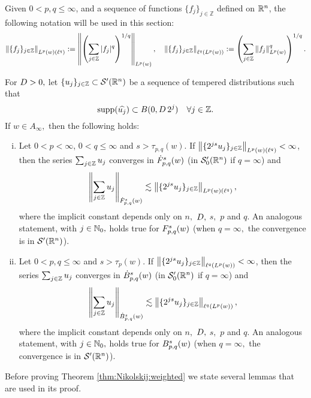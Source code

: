 Given $0<p,q\leq\infty$, and a sequence of functions $\{ f_j\}_{j\in\mathbb{Z}}$ defined on $\re^n$, the following notation will be used in this section:
\[ \norm{\{f_j\}_{j\in\mathbb{Z}}}{L^p(w)(\ell^q)}:= \norm{\left( \sum\limits_{j\in\mathbb{Z}} |f_j|^q \right)^{1/q} }{L^p(w)}, \quad \norm{\{f_j\}_{j\in\mathbb{Z}}}{\ell^q(L^p(w))}:=\left( \sum\limits_{j\in\mathbb{Z}} \norm{f_j}{L^p(w)}^q \right)^{1/q}. \] 
\begin{theorem} \label{thm:Nikolskij:weighted} For $\A> 0,$ let $\{u_j\}_{j \in \ent} \subset \mathcal{S}'(\rn)$ be a sequence of tempered distributions such that
\begin{equation*}
\supp(\widehat{u_j}) \subset B(0, \A\, 2^j ) \quad \forall j \in \ent.
\end{equation*}
If $w\in A_\infty,$ then the following holds:  
\begin{enumerate}[(i)]
\item\label{item:thh:Nikolskij:TL} Let $0 < p < \infty$, $0 < q \leq \infty$ and $s > \tau_{p,q}(w)$. If $\norm{\{2^{js} u_j\}_{j\in\ent}}{L^p(w)(\ell^{q})} < \infty$, then the series $\sum_{j \in \ent} u_j$ converges in $\tlw{p}{s}{q}{w}$ (in $\mathcal{S}'_0(\rn)$ if $q=\infty$) and 
\begin{equation*}
\norm{\sum_{j \in \ent} u_j}{\tlw{p}{s}{q}{w}} \lesssim  \norm{\{2^{js} u_j\}_{j\in\ent}}{L^p(w)(\ell^{q})},
\end{equation*}
where the implicit constant depends only on $n,$ $\A,$ $s,$ $p$ and  $q.$  An analogous statement, with $j\in\naz,$ holds true for $\itlw{p}{s}{q}{w}$ (when $q=\infty,$  the convergence is in $\swp$).
\item\label{item:thh:Nikolskij:B} Let $0 < p, q \leq \infty$ and $s > \tau_p(w)$. If $\norm{\{2^{js} u_j\}_{j\in\ent}}{\ell^{q}(L^p(w))} < \infty$, then the series $\sum_{j \in \ent} u_j$ converges in  $\besw{p}{s}{q}{w}$ (in $\mathcal{S}'_0(\rn)$ if $q=\infty$) and 
\begin{equation*}
\norm{\sum_{j \in \ent} u_j}{\besw{p}{s}{q}{w}} \lesssim  \norm{\{2^{js} u_j\}_{j\in\ent}}{\ell^{q}(L^p(w))},
\end{equation*}
where the implicit constant depends only on $n,$ $\A,$ $s,$ $p$ and $q.$   An analogous statement, with $j\in\naz,$ holds true for $\ibesw{p}{s}{q}{w}$ (when $q=\infty,$  the convergence is in $\swp$).
\end{enumerate}
\end{theorem}
 
Before proving Theorem \ref{thm:Nikolskij:weighted} we state several lemmas that are used in its proof. 
 
